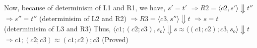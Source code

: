 \documentclass[a4paper, 11pt]{article}
\begin{document}
\begin{prooftree}

\end{prooftree}
Now, because of determinism of L1 and R1, we have, \newline
$ s' = t' $\newline
$\Rightarrow R2 = \langle c2, s' \rangle \Downarrow t''$\newline
$\Rightarrow s'' = t'' $ {\scriptsize(determinisim of L2 and R2)} \newline
$\Rightarrow R3 = \langle c3, s'' \rangle \Downarrow t$\newline
$\Rightarrow s = t $ {\scriptsize(determinisim of L3 and R3)} \newline
Thus, $\langle c1; (c2; c3), s_o \rangle \Downarrow s \approx \langle (c1; c2); c3, s_o \rangle \Downarrow t$\newline
$\Rightarrow c1; (c2; c3) \approx (c1; c2); c3$ (Proved)
\end{document}
